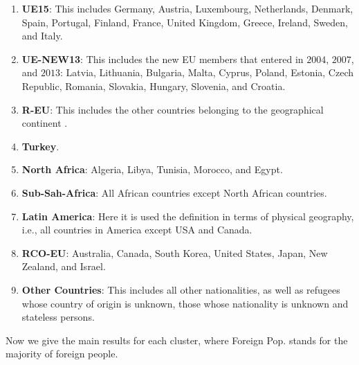 \documentclass[a4paper,11pt]{amsart}
\begin{document}
\begin{enumerate}[1)]

\item \textbf{UE15}: This includes Germany, Austria, Luxembourg, Netherlands, Denmark, Spain, Portugal, Finland, France, United Kingdom, Greece, Ireland, Sweden, and Italy.
 
\item \textbf{UE-NEW13}: This includes the new EU members that entered in $2004$, $2007$, and $2013$: Latvia, Lithuania, Bulgaria, Malta, Cyprus, Poland, Estonia, Czech Republic, Romania, Slovakia, Hungary, Slovenia, and Croatia.
 
\item \textbf{R-EU}: This includes the other countries belonging to the geographical continent .
 
\item \textbf{Turkey}. 
 
\item \textbf{North Africa}: Algeria, Libya, Tunisia, Morocco, and Egypt.
 
\item \textbf{Sub-Sah-Africa}: All African countries except North African countries.
 
\item \textbf{Latin America}: Here it is used the definition in terms of physical geography, i.e., all countries in America except USA and Canada.
 
\item \textbf{RCO-EU}: Australia, Canada, South Korea, United States, Japan, New Zealand, and Israel.
 
\item \textbf{Other Countries}: This includes all other nationalities, as well as refugees whose country of origin is unknown, those whose nationality is unknown and stateless persons.
\end{enumerate}
Now we give the main results for each cluster, where Foreign Pop. stands for the majority of foreign people.
\end{document}
